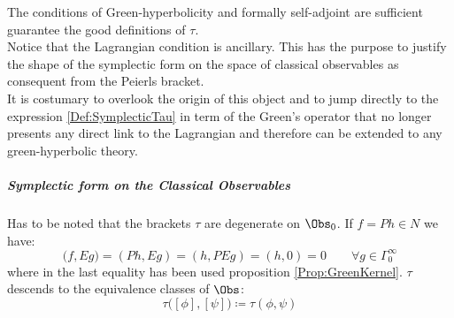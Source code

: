 \documentclass[Main]{subfiles}
\begin{document}
							The conditions of Green-hyperbolicity and formally self-adjoint are sufficient guarantee the good definitions of $\tau$.\\
							Notice that the Lagrangian condition is ancillary. This has the purpose to justify the shape of the symplectic form on the space of classical observables as consequent from the Peierls bracket.
							\\
							It is costumary\cite{Dewitt1999}\cite{Benini} to overlook the origin of this object and to jump directly to the expression \ref{Def:SymplecticTau}  in term of the Green's operator that no longer presents any direct link to the Lagrangian and therefore can be extended to any green-hyperbolic theory.
		
			\subparagraph{Symplectic form on the Classical Observables}
				Has to be noted that the brackets $\tau$ are degenerate on $\Obs_0$. 
				If $f=Ph \in N$ we have:
				\begin{displaymath}
					\big( f , E g \big) = (P h , E g) = (h, PE g) = (h,0) = 0 \qquad \forall g \in \Gamma_0^\infty
				\end{displaymath}
				where in the last equality has been used proposition \ref{Prop:GreenKernel}.
				$\tau$ descends
				to the equivalence classes of $\Obs$:
				\begin{equation}
					\tau\big( [\phi], [\psi] \big) \coloneqq \tau(\phi, \psi)
				\end{equation}
				
\end{document}
